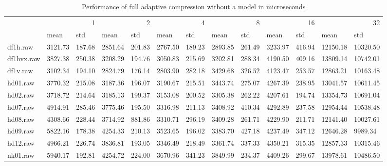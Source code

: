 \begin{table}
\caption{Performance of full adaptive compression without a model in microseconds}
\begin{tabular}{lllllllllllll}
 & \multicolumn{2}{r}{1} & \multicolumn{2}{r}{2} & \multicolumn{2}{r}{4} & \multicolumn{2}{r}{8} & \multicolumn{2}{r}{16} & \multicolumn{2}{r}{32} \\
 & mean & std & mean & std & mean & std & mean & std & mean & std & mean & std \\
df1h.raw & 3121.73 & 187.68 & 2851.64 & 201.83 & 2767.50 & 189.23 & 2893.85 & 261.49 & 3233.97 & 416.94 & 12150.18 & 10320.50 \\
df1hvx.raw & 3827.38 & 250.38 & 3208.29 & 194.76 & 3050.83 & 215.69 & 3202.81 & 288.34 & 4190.50 & 409.16 & 13809.14 & 10742.01 \\
df1v.raw & 3102.34 & 194.10 & 2824.79 & 176.14 & 2803.90 & 282.18 & 3429.68 & 326.52 & 4123.47 & 253.57 & 12863.21 & 10163.48 \\
hd01.raw & 3770.32 & 215.08 & 3187.36 & 196.07 & 3190.67 & 215.51 & 3443.74 & 275.07 & 4267.39 & 238.95 & 13041.57 & 10611.45 \\
hd02.raw & 3718.72 & 214.64 & 3185.13 & 199.37 & 3153.08 & 200.52 & 3305.38 & 262.22 & 4207.61 & 194.74 & 13354.73 & 10691.04 \\
hd07.raw & 4914.91 & 285.46 & 3775.46 & 195.50 & 3316.98 & 211.13 & 3408.92 & 410.34 & 4292.89 & 237.58 & 12954.44 & 10538.48 \\
hd08.raw & 4308.66 & 228.44 & 3714.92 & 881.86 & 3310.71 & 296.19 & 3409.28 & 261.71 & 4229.90 & 211.71 & 12141.40 & 10027.61 \\
hd09.raw & 5822.16 & 178.38 & 4254.33 & 210.13 & 3523.65 & 196.02 & 3383.70 & 427.18 & 4237.49 & 347.12 & 12646.28 & 9989.34 \\
hd12.raw & 4966.21 & 226.74 & 3836.81 & 193.05 & 3346.49 & 218.49 & 3361.74 & 337.33 & 4350.21 & 315.35 & 12857.33 & 10315.46 \\
nk01.raw & 5940.17 & 192.81 & 4254.72 & 224.00 & 3670.96 & 341.23 & 3849.99 & 234.37 & 4409.26 & 299.67 & 13978.61 & 10486.50 \\
\end{tabular}
\end{table}
